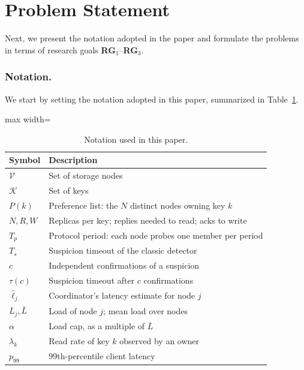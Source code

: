 \documentclass[sigconf,nonacm]{acmart}
\begin{document}
\section{Problem Statement}

Next, we present the notation adopted in the paper and formulate the problems in terms of research goals \textbf{RG}$_1$--\textbf{RG}$_3$.

\subsubsection{Notation.} We start by setting the notation adopted in this paper, summarized in Table~\ref{tab:notation}.

\begin{table}[h]
\caption{Notation used in this paper.}
\label{tab:notation}
\small
\begin{adjustbox}{max width=\columnwidth}
\begin{tabular}{|l|l|}
\hline
\textbf{Symbol} & \textbf{Description} \\ \hline
$\mathcal{V}$ & Set of storage nodes \\
$\mathcal{K}$ & Set of keys \\
$P(k)$ & Preference list: the $N$ distinct nodes owning key $k$ \\
$N, R, W$ & Replicas per key; replies needed to read; acks to write \\
$T_p$ & Protocol period: each node probes one member per period \\
$T_s$ & Suspicion timeout of the classic detector \\
$c$ & Independent confirmations of a suspicion \\
$\tau(c)$ & Suspicion timeout after $c$ confirmations \\
$\hat{\ell}_j$ & Coordinator's latency estimate for node $j$ \\
$L_j, \bar{L}$ & Load of node $j$; mean load over nodes \\
$\alpha$ & Load cap, as a multiple of $\bar{L}$ \\
$\lambda_k$ & Read rate of key $k$ observed by an owner \\
$p_{99}$ & 99th-percentile client latency \\ \hline
\end{tabular}
\end{adjustbox}
\end{table}
\end{document}

